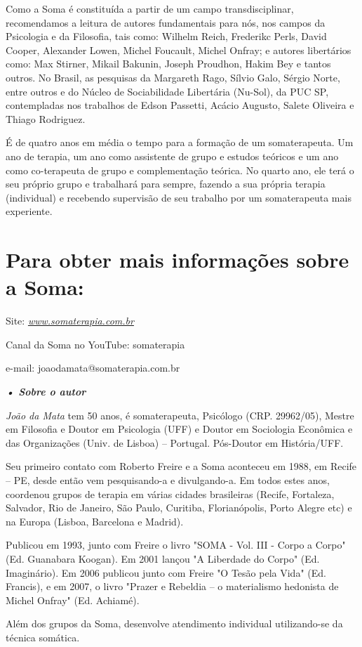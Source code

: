 Como a Soma é constituída a partir de um campo transdisciplinar,
recomendamos a leitura de autores fundamentais para nós, nos campos da
Psicologia e da Filosofia, tais como: Wilhelm Reich, Frederikc Perls,
David Cooper, Alexander Lowen, Michel Foucault, Michel Onfray; e autores
libertários como: Max Stirner, Mikail Bakunin, Joseph Proudhon, Hakim
Bey e tantos outros. No Brasil, as pesquisas da Margareth Rago, Sílvio
Galo, Sérgio Norte, entre outros e do Núcleo de Sociabilidade Libertária
(Nu-Sol), da PUC SP, contempladas nos trabalhos de Edson Passetti,
Acácio Augusto, Salete Oliveira e Thiago Rodriguez.

É de quatro anos em média o tempo para a formação de um somaterapeuta.
Um ano de terapia, um ano como assistente de grupo e estudos teóricos e
um ano como co-terapeuta de grupo e complementação teórica. No quarto
ano, ele terá o seu próprio grupo e trabalhará para sempre, fazendo a
sua própria terapia (individual) e recebendo supervisão de seu trabalho
por um somaterapeuta mais experiente.

\section{Para obter mais informações sobre a Soma:}

Site:
\href{http://www.somaterapia.com.br/}{\emph{www.somaterapia.com.br}}

Canal da Soma no YouTube: somaterapia

e-mail: joaodamata@somaterapia.com.br

\emph{\textbf{• Sobre o autor}}

\emph{João da Mata} tem 50 anos, é somaterapeuta, Psicólogo (CRP.
29962/05), Mestre em Filosofia e Doutor em Psicologia (UFF) e Doutor em
Sociologia Econômica e das Organizações (Univ. de Lisboa) -- Portugal.
Pós-Doutor em História/UFF.

Seu primeiro contato com Roberto Freire e a Soma aconteceu em 1988, em
Recife -- PE, desde então vem pesquisando-a e divulgando-a. Em todos
estes anos, coordenou grupos de terapia em várias cidades brasileiras
(Recife, Fortaleza, Salvador, Rio de Janeiro, São Paulo, Curitiba,
Florianópolis, Porto Alegre etc) e na Europa (Lisboa, Barcelona e
Madrid).

Publicou em 1993, junto com Freire o livro "SOMA - Vol. III - Corpo a
Corpo" (Ed. Guanabara Koogan). Em 2001 lançou "A Liberdade do Corpo"
(Ed. Imaginário). Em 2006 publicou junto com Freire "O Tesão pela Vida"
(Ed. Francis), e em 2007, o livro "Prazer e Rebeldia -- o materialismo
hedonista de Michel Onfray" (Ed. Achiamé).

Além dos grupos da Soma, desenvolve atendimento individual utilizando-se
da técnica somática.
